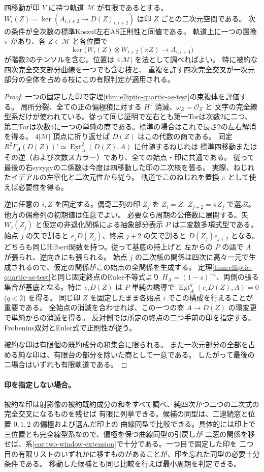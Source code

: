 \begin{theorem}\label{thm:finite-orbit-quartic-marks}
四移動が印 $Y$ に持つ軌道 $\mathcal M$ が有限であるとする。
$W_i(Z)=\ker(A_{i,i+2}\to D(Z)_{i,i+2})$ は印 $Z$ ごとの二次元空間である。
次の条件が全次数の標準Koszul左右AS正則性と同値である。
軌道上に一つの置換 $\pi$ があり、各 $Z\in\mathcal M$ と各位置で
\[
 \ker\bigl(W_i(Z)\otimes W_{i+2}(\pi Z)\longrightarrow A_{i,i+4}\bigr)
\]
が階数2のテンソルを含む。位置は $4|\mathcal M|$ を法として調べればよい。
特に被約な四次完全交叉部分曲線を一つでも含む枝と、
重複を許す四次完全交叉が一次元部分の全体を占める枝にこの有限判定が適用される。
\end{theorem}
\begin{proof}
一つの固定した印で定理\ref{thm:elliptic-quartic-as-test}の束複体を評価する。
局所分裂、全ての正の偏極積に対する $H^1$ 消滅、$\omega_Z=\mathcal O_Z$ と
文字の完全線型系だけが使われている。従って同じ証明で左右とも第一Torは次数2に二つ、
第二Torは次数4に一つの単純の商である。標準の場合はこれで長さ2の左右解消を得る。
$4|\mathcal M|$ 頂点に折り返せば $D(Z)$ はこの代数の商である。
同定 $R^2\Gamma_A(D(Z))'\simeq\underline{\operatorname{Ext}}^2_A(D(Z),A)$ に付随するねじれは
標準四移動またはその逆（および次数スカラー）であり、全ての始点・印に共通である。
従って最後の右syzygyの二係数は今度は四移動した印の二次核を張る。
実際、ねじれたイデアルの左零化と二次元性から従う。
軌道でこのねじれを置換 $\pi$ として使えば必要性を得る。

逆に任意の $i,Z$ を固定する。偶奇二列の印 $Z_j$ を
$Z_i=Z,\ Z_{j+2}=\pi Z_j$ で選ぶ。他方の偶奇列の初期値は任意でよい。
必要なら周期の公倍数に展開する。矢 $W_j(Z_j)$ と仮定の非退化関係による抽象部分表示 $P$
は二変数多項式型である。始点 $j$ の矢で割ると $e_jD(Z_j)$、終点 $j+2$ の矢で割ると
$D(Z_j)e_{j+2}$ となる。どちらも同じHilbert関数を持つ。従って基底の持上げと
左からの $P$ の語で $A$ が張られ、逆向きにも張られる。
始点 $j$ の二次核の関係は四次に高々一元で生成されるので、仮定の関係がこの始点の全関係を生成する。
定理\ref{thm:elliptic-quartic-as-test}と同じ固定終点のEuler不等式より
$H_A=(1-z)^{-4}$、両側の張る集合が基底となる。特に $e_i D(Z)$ は $P$ 単純の誘導で
$\underline{\operatorname{Ext}}_A^q(e_iD(Z),A)=0$ ($q<2$) を得る。
同じ印 $Z$ を固定したまま各始点 $i$ でこの構成を行えることが重要である。
全始点の消滅を合わせれば、この一つの商 $A\to D(Z)$ の環変更で単純からの消滅を得る。
反対側では所定の終点の二つ手前の印を指定する。Frobenius双対とEuler式で正則性が従う。

被約な印は有限個の既約成分の和集合に限られる。
また一次元部分の全部を占める純な印は、有限台の部分を除いた商として一意である。
したがって最後の二場合はいずれも有限軌道である。
\end{proof}

\paragraph{印を指定しない場合。}
被約な印は射影像の被約既約成分の和をすべて調べ、純四次かつ二つの二次式の完全交叉になるものを残せば
有限に列挙できる。候補の同型は、二連続窓と位置 $0,1,2$ の偏極および選んだ印上の
曲線同型で比較できる。具体的には印上で三位置とも完全線型系なので、偏極を保つ曲線同型の引戻しが
二窓の関係を移せば、系\ref{cor:two-window-extension}で十分である。一つ目で固定した印を
二つ目の有限リストのいずれかに移すものがあることが、印を忘れた同型の必要十分条件である。
移動した候補とも同じ比較を行えば最小周期を判定できる。
